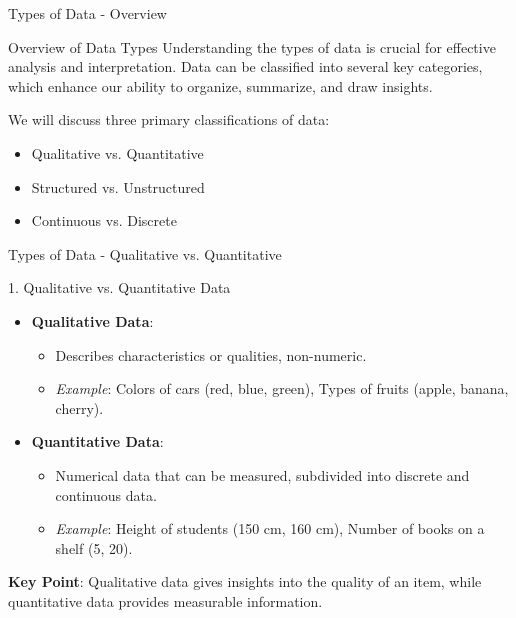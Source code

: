 \documentclass[aspectratio=169]{beamer}
\begin{document}
\begin{frame}[fragile]{Types of Data - Overview}
    \begin{block}{Overview of Data Types}
        Understanding the types of data is crucial for effective analysis and interpretation. Data can be classified into several key categories, which enhance our ability to organize, summarize, and draw insights.
    \end{block}
    We will discuss three primary classifications of data:
    \begin{itemize}
        \item Qualitative vs. Quantitative
        \item Structured vs. Unstructured
        \item Continuous vs. Discrete
    \end{itemize}
\end{frame}

\begin{frame}[fragile]{Types of Data - Qualitative vs. Quantitative}
    \begin{block}{1. Qualitative vs. Quantitative Data}
        \begin{itemize}
            \item \textbf{Qualitative Data}: 
                \begin{itemize}
                    \item Describes characteristics or qualities, non-numeric.
                    \item \textit{Example}: Colors of cars (red, blue, green), Types of fruits (apple, banana, cherry).
                \end{itemize}
            \item \textbf{Quantitative Data}:
                \begin{itemize}
                    \item Numerical data that can be measured, subdivided into discrete and continuous data.
                    \item \textit{Example}: Height of students (150 cm, 160 cm), Number of books on a shelf (5, 20).
                \end{itemize}
        \end{itemize}
        \textbf{Key Point}: Qualitative data gives insights into the quality of an item, while quantitative data provides measurable information.
    \end{block}
\end{frame}
\end{document}
